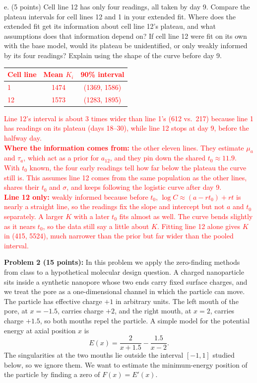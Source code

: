 \documentclass[11pt]{article}
\begin{document}
e. (5 points) Cell line 12 has only four readings, all taken by day 9. Compare the plateau
intervals for cell lines 12 and 1 in your extended fit. Where does the extended fit get its
information about cell line 12's plateau, and what assumptions does that information depend on?
If cell line 12 were fit on its own with the base model, would its plateau be unidentified, or
only weakly informed by its four readings? Explain using the shape of the curve before day 9.

\textcolor{red}{
\begin{center}
\begin{tabular}{lcc}
Cell line & Mean $K_i$ & 90\% interval \\ \hline
1 & 1474 & (1369, 1586) \\
12 & 1573 & (1283, 1895)
\end{tabular}
\end{center}
Line 12's interval is about 3 times wider than line 1's (612 vs.\ 217) because line 1 has readings on its plateau (days 18--30), while line 12 stops at day 9, before the halfway day.\\
\textbf{Where the information comes from:} the other eleven lines. They estimate $\mu_a$ and $\tau_a$, which act as a prior for $a_{12}$, and they pin down the shared $t_0 \approx 11.9$. With $t_0$ known, the four early readings tell how far below the plateau the curve still is. This assumes line 12 comes from the same population as the other lines, shares their $t_0$ and $\sigma$, and keeps following the logistic curve after day 9.\\
\textbf{Line 12 only:} weakly informed because before $t_0$, $\log C \approx (a - r t_0) + r t$ is nearly a straight line, so the readings fix the slope and intercept but not $a$ and $t_0$ separately. A larger $K$ with a later $t_0$ fits almost as well. The curve bends slightly as it nears $t_0$, so the data still say a little about $K$. Fitting line 12 alone gives $K$ in (415, 5524), much narrower than the prior but far wider than the pooled interval.
}

\vspace{0.5em}
{\bf Problem 2 (15 points):} In this problem we apply the zero-finding methods from class to a
hypothetical molecular design question. A charged nanoparticle sits inside a synthetic nanopore
whose two ends carry fixed surface charges, and we treat the pore as a one-dimensional channel
in which the particle can move. The particle has effective charge $+1$ in arbitrary units. The
left mouth of the pore, at $x=-1.5$, carries charge $+2$, and the right mouth, at $x=2$, carries
charge $+1.5$, so both mouths repel the particle. A simple model for the potential energy at axial position $x$ is
\[
E(x)=\frac{2}{x+1.5}-\frac{1.5}{x-2}.
\]
The singularities at the two mouths lie outside the interval $[-1,1]$ studied below, so we
ignore them. We want to estimate the
minimum-energy position of the particle by finding a zero of $F(x)=E'(x)$.
\end{document}

